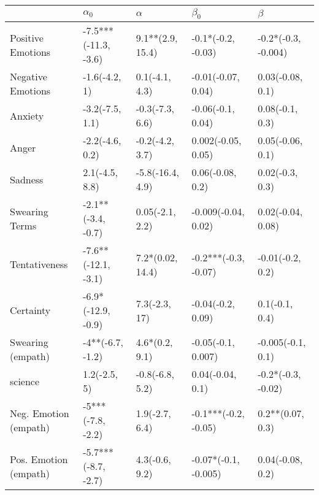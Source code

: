 \begin{tabular}{lllll}
\toprule
{} &            $\alpha_0$ &          $\alpha$ &             $\beta_0$ &              $\beta$ \\
\midrule
Positive Emotions     &  -7.5***(-11.3, -3.6) &  9.1**(2.9, 15.4) &    -0.1*(-0.2, -0.03) &  -0.2*(-0.3, -0.004) \\
Negative Emotions     &         -1.6(-4.2, 1) &    0.1(-4.1, 4.3) &    -0.01(-0.07, 0.04) &     0.03(-0.08, 0.1) \\
Anxiety               &       -3.2(-7.5, 1.1) &   -0.3(-7.3, 6.6) &     -0.06(-0.1, 0.04) &      0.08(-0.1, 0.3) \\
Anger                 &       -2.2(-4.6, 0.2) &   -0.2(-4.2, 3.7) &    0.002(-0.05, 0.05) &     0.05(-0.06, 0.1) \\
Sadness               &        2.1(-4.5, 8.8) &  -5.8(-16.4, 4.9) &      0.06(-0.08, 0.2) &      0.02(-0.3, 0.3) \\
Swearing Terms        &    -2.1**(-3.4, -0.7) &   0.05(-2.1, 2.2) &   -0.009(-0.04, 0.02) &    0.02(-0.04, 0.08) \\
Tentativeness         &   -7.6**(-12.1, -3.1) &  7.2*(0.02, 14.4) &  -0.2***(-0.3, -0.07) &     -0.01(-0.2, 0.2) \\
Certainty             &    -6.9*(-12.9, -0.9) &     7.3(-2.3, 17) &     -0.04(-0.2, 0.09) &       0.1(-0.1, 0.4) \\
Swearing (empath)     &      -4**(-6.7, -1.2) &    4.6*(0.2, 9.1) &    -0.05(-0.1, 0.007) &    -0.005(-0.1, 0.1) \\
science               &          1.2(-2.5, 5) &   -0.8(-6.8, 5.2) &      0.04(-0.04, 0.1) &   -0.2*(-0.3, -0.02) \\
Neg. Emotion (empath) &     -5***(-7.8, -2.2) &    1.9(-2.7, 6.4) &  -0.1***(-0.2, -0.05) &     0.2**(0.07, 0.3) \\
Pos. Emotion (empath) &   -5.7***(-8.7, -2.7) &    4.3(-0.6, 9.2) &  -0.07*(-0.1, -0.005) &     0.04(-0.08, 0.2) \\
\bottomrule
\end{tabular}
